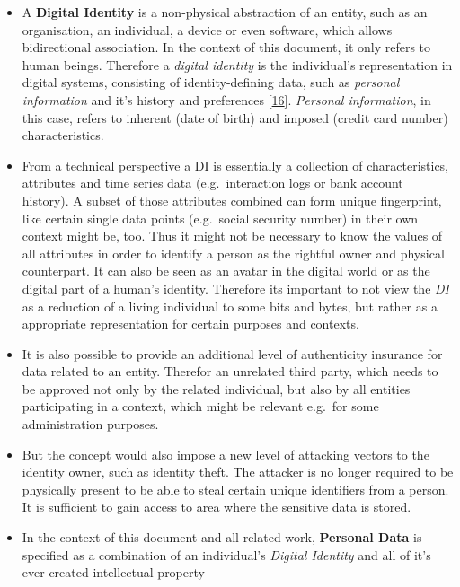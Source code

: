 \documentclass[12pt,english,a4paper,titlepage,cleardoublepage=empty,dottedtoc]{report}
\begin{document}
\begin{itemize}
\item
  A \textbf{Digital Identity} is a non-physical abstraction of an
  entity, such as an organisation, an individual, a device or even
  software, which allows bidirectional association. In the context of
  this document, it only refers to human beings. Therefore a
  \emph{digital identity} is the individual's representation in digital
  systems, consisting of identity-defining data, such as \emph{personal
  information} and it's history and preferences
  {[}\protect\hyperlink{ref-whitepaper_2012_the-value-of-our-digital-identity_definition}{16}{]}.
  \emph{Personal information}, in this case, refers to inherent (date of
  birth) and imposed (credit card number) characteristics.
\item
  From a technical perspective a DI is essentially a collection of
  characteristics, attributes and time series data (e.g.~interaction
  logs or bank account history). A subset of those attributes combined
  can form unique fingerprint, like certain single data points
  (e.g.~social security number) in their own context might be, too. Thus
  it might not be necessary to know the values of all attributes in
  order to identify a person as the rightful owner and physical
  counterpart. It can also be seen as an avatar in the digital world or
  as the digital part of a human's identity. Therefore its important to
  not view the \emph{DI} as a reduction of a living individual to some
  bits and bytes, but rather as a appropriate representation for certain
  purposes and contexts.
\item
  It is also possible to provide an additional level of authenticity
  insurance for data related to an entity. Therefor an unrelated third
  party, which needs to be approved not only by the related individual,
  but also by all entities participating in a context, which might be
  relevant e.g.~for some administration purposes.
\item
  But the concept would also impose a new level of attacking vectors to
  the identity owner, such as identity theft. The attacker is no longer
  required to be physically present to be able to steal certain unique
  identifiers from a person. It is sufficient to gain access to area
  where the sensitive data is stored.
\item
  In the context of this document and all related work, \textbf{Personal
  Data} is specified as a combination of an individual's \emph{Digital
  Identity} and all of it's ever created intellectual property

\end{itemize}
\end{document}
